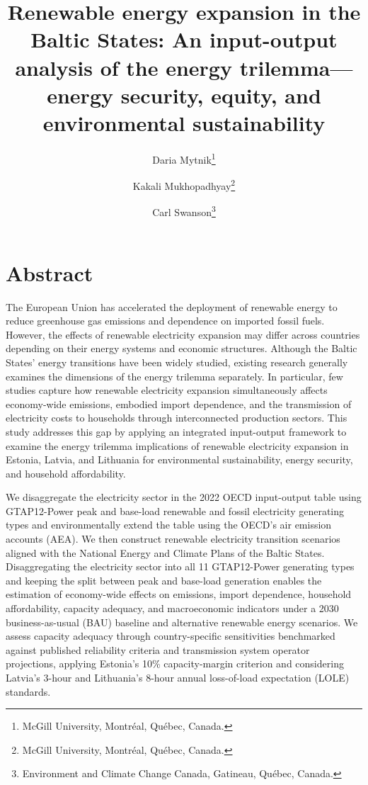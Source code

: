 \documentclass[10pt]{article}
\title{Renewable energy expansion in the Baltic States: An input-output analysis of 
the energy trilemma---energy security, equity, and environmental 
sustainability}
\author{
    Daria Mytnik\thanks{McGill University, 
    Montréal, Québec, Canada.}
    \and
    Kakali Mukhopadhyay\thanks{McGill University, 
    Montréal, Québec, Canada.}
    \and
    Carl Swanson\thanks{Environment and Climate Change Canada, 
    Gatineau, Québec, Canada.}
}
\date{}
\begin{document}
\maketitle

\section*{Abstract}

The European Union has accelerated the deployment of renewable energy to reduce greenhouse gas emissions and 
dependence on imported fossil fuels. However, the effects of renewable electricity expansion may differ across 
countries depending on their energy systems and economic structures. Although the Baltic States' energy transitions 
have been widely studied, existing research generally examines the dimensions of the energy trilemma separately. 
In particular, few studies capture how renewable electricity expansion simultaneously affects economy-wide emissions, 
embodied import dependence, and the transmission of electricity costs to households through interconnected 
production sectors. This study addresses this gap by applying an integrated input-output framework to examine 
the energy trilemma implications of renewable electricity expansion in Estonia, Latvia, and Lithuania for 
environmental sustainability, energy security, and household affordability.

We disaggregate the electricity sector in the 2022 OECD input-output table using
GTAP12-Power peak and base-load renewable and fossil electricity generating types and environmentally extend
the table using the OECD's air emission accounts (AEA). We then construct
renewable electricity transition scenarios aligned with the National Energy and Climate Plans of 
the Baltic States. Disaggregating the electricity sector into all 11 GTAP12-Power generating types and
keeping the split between peak and base-load generation enables 
the estimation of economy-wide effects on emissions, import dependence, 
household affordability, capacity adequacy, and macroeconomic indicators under a 2030 business-as-usual (BAU) baseline and 
alternative renewable energy scenarios. We assess capacity adequacy through 
country-specific sensitivities benchmarked against published reliability criteria and 
transmission system operator projections, applying Estonia's 10\% capacity-margin criterion and 
considering Latvia's 3-hour and Lithuania's 8-hour annual loss-of-load expectation (LOLE) standards.
\end{document}
